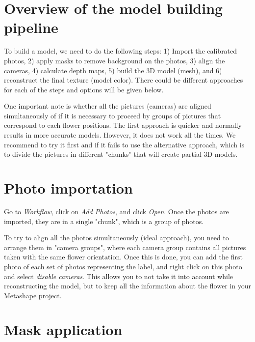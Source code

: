 \documentclass[
]{book}
\theoremstyle{definition}
\theoremstyle{definition}
\theoremstyle{definition}
\theoremstyle{definition}
\theoremstyle{remark}
\begin{document}
\hypertarget{overview-of-the-model-building-pipeline}{%
\section{Overview of the model building pipeline}\label{overview-of-the-model-building-pipeline}}

To build a model, we need to do the following steps: 1) Import the
calibrated photos, 2) apply masks to remove background on the photos, 3)
align the cameras, 4) calculate depth maps, 5) build the 3D model
(mesh), and 6) reconstruct the final texture (model color). There could
be different approaches for each of the steps and options will be given
below.

One important note is whether all the pictures (cameras) are aligned
simultaneously of if it is necessary to proceed by groups of pictures
that correspond to each flower positions. The first approach is quicker
and normally results in more accurate models. However, it does not work
all the times. We recommend to try it first and if it fails to use the
alternative approach, which is to divide the pictures in different
"chunks" that will create partial 3D models.

\hypertarget{photo-importation}{%
\section{Photo importation}\label{photo-importation}}

Go to \emph{Workflow}, click on \emph{Add Photos}, and click \emph{Open}. Once the
photos are imported, they are in a single "chunk", which is a group of
photos.

To try to align all the photos simultaneously (ideal approach), you need
to arrange them in "camera groups", where each camera group contains
all pictures taken with the same flower orientation. Once this is done,
you can add the first photo of each set of photos representing the
label, and right click on this photo and select \emph{disable cameras}. This
allows you to not take it into account while reconstructing the model,
but to keep all the information about the flower in your Metashape
project.

\hypertarget{mask-application}{%
\section{Mask application}\label{mask-application}}
\end{document}
